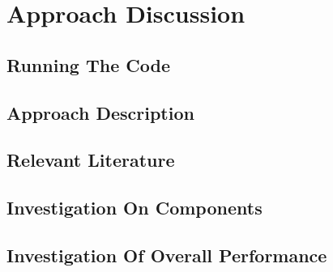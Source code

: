 \chapter{Approach Discussion}

\section{Running The Code}

\section{Approach Description}

\section{Relevant Literature}

\section{Investigation On Components}

\section{Investigation Of Overall Performance}
